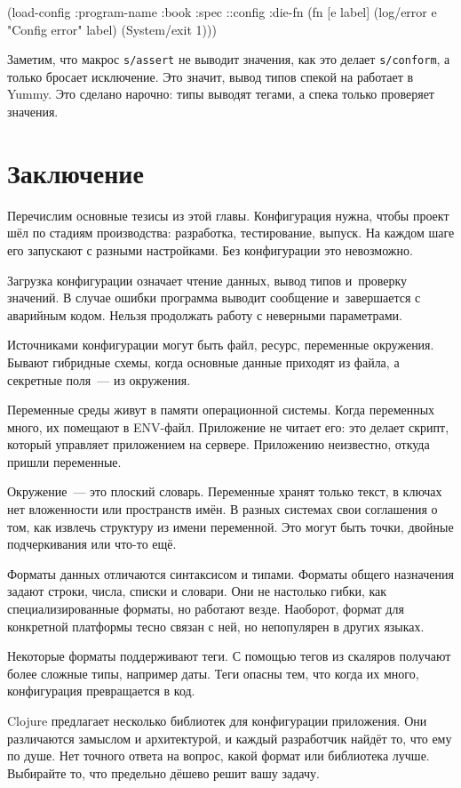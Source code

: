 \else

\begin{english}
  \begin{clojure}
(load-config
 {:program-name :book
  :spec ::config
  :die-fn (fn [e label]
            (log/error e "Config error" label)
            (System/exit 1))})
  \end{clojure}
\end{english}

\fi

Заметим, что макрос \verb|s/assert| не выводит значения, как это делает
\verb|s/conform|, а только бросает исключение. Это значит, вывод типов спекой на
работает в Yummy. Это сделано нарочно: типы выводят тегами, а спека только
проверяет значения.

\section{Заключение}

Перечислим основные тезисы из этой главы. Конфигурация нужна, чтобы проект шёл
по стадиям производства: разработка, тестирование, выпуск. На каждом шаге его
запускают с разными настройками. Без конфигурации это невозможно.

Загрузка конфигурации означает чтение данных, вывод типов и~проверку значений. В
случае ошибки программа выводит сообщение и~завершается с аварийным
кодом. Нельзя продолжать работу с неверными параметрами.

Источниками конфигурации могут быть файл, ресурс, переменные окружения. Бывают
гибридные схемы, когда основные данные приходят из файла, а секретные поля~--- из
окружения.

Переменные среды живут в памяти операционной системы. Когда переменных много, их
помещают в ENV-файл. Приложение не читает его: это делает скрипт, который
управляет приложением на сервере. Приложению неизвестно, откуда пришли
переменные.

Окружение~--- это плоский словарь. Переменные хранят только текст, в ключах нет
вложенности или пространств имён. В разных системах свои соглашения о том, как
извлечь структуру из имени переменной. Это могут быть точки, двойные
подчеркивания или что-то ещё.

Форматы данных отличаются синтаксисом и типами. Форматы общего назначения задают
строки, числа, списки и словари. Они не настолько гибки, как специализированные
форматы, но работают везде. Наоборот, формат для конкретной платформы тесно
связан с ней, но непопулярен в других языках.

Некоторые форматы поддерживают теги. С помощью тегов из скаляров получают более
сложные типы, например даты. Теги опасны тем, что когда их много, конфигурация
превращается в код.

Clojure предлагает несколько библиотек для конфигурации приложения. Они
различаются замыслом и архитектурой, и каждый разработчик найдёт то, что ему по
душе. Нет точного ответа на вопрос, какой формат или библиотека лучше. Выбирайте
то, что предельно дёшево решит вашу задачу.
